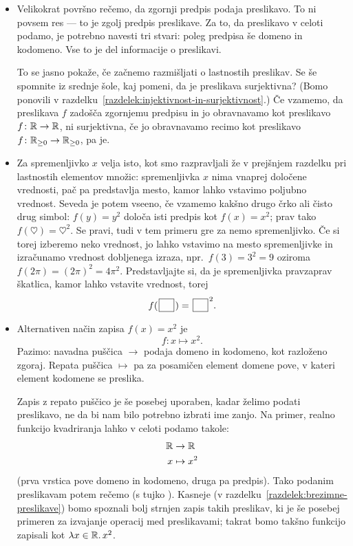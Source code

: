 \begin{itemize}
\item
Velikokrat površno rečemo, da zgornji predpis podaja preslikavo. To ni povsem res --- to je zgolj predpis preslikave. Za to, da preslikavo v celoti podamo, je potrebno navesti tri stvari: poleg predpisa še domeno in kodomeno. Vse to je del informacije o preslikavi.


To se jasno pokaže, če začnemo razmišljati o lastnostih preslikav. Se še spomnite iz srednje šole, kaj pomeni, da je preslikava surjektivna? (Bomo ponovili v razdelku~\ref{razdelek:injektivnost-in-surjektivnost}.) Če vzamemo, da preslikava $f$ zadošča zgornjemu predpisu in jo obravnavamo kot preslikavo $f\colon \mathbb{R} \to \mathbb{R}$, ni surjektivna, če jo obravnavamo recimo kot preslikavo $f\colon \mathbb{R}_{\geq 0} \to \mathbb{R}_{\geq 0}$, pa je.
\item
Za spremenljivko $x$ velja isto, kot smo razpravljali že v prejšnjem razdelku pri lastnostih elementov množic: spremenljivka $x$ nima vnaprej določene vrednosti, pač pa predstavlja mesto, kamor lahko vstavimo poljubno vrednost. Seveda je potem vseeno, če vzamemo kakšno drugo črko ali čisto drug simbol: $f(y) = y^2$ določa isti predpis kot $f(x) = x^2$; prav tako $f(\heartsuit) = \heartsuit^2$. Se pravi, tudi v tem primeru gre za nemo spremenljivko. Če si torej izberemo neko vrednost, jo lahko vstavimo na mesto spremenljivke in izračunamo vrednost dobljenega izraza, npr.~$f(3) = 3^2 = 9$ oziroma $f(2\pi) = (2\pi)^2 = 4\pi^2$. Predstavljajte si, da je spremenljivka pravzaprav škatlica, kamor lahko vstavite vrednost, torej
\[f(\argbox) = \argbox^2.\]
\item
Alternativen način zapisa $f(x) = x^2$ je
\[f\colon x \mapsto x^2.\]
Pazimo: navadna puščica $\to$ podaja domeno in kodomeno, kot razloženo zgoraj. Repata puščica $\mapsto$ pa za posamičen element domene pove, v kateri element kodomene se preslika.

Zapis z repato puščico je še posebej uporaben, kadar želimo podati preslikavo, ne da bi nam bilo potrebno izbrati ime zanjo. Na primer, realno funkcijo kvadriranja lahko v celoti podamo takole:
\begin{align*}
\mathbb{R} &\to \mathbb{R} \\
x &\mapsto x^2
\end{align*}
(prva vrstica pove domeno in kodomeno, druga pa predpis). Tako podanim preslikavam potem rečemo  (s tujko ). Kasneje (v razdelku~\ref{razdelek:brezimne-preslikave}) bomo spoznali bolj strnjen zapis takih preslikav, ki je še posebej primeren za izvajanje operacij med preslikavami; takrat bomo takšno funkcijo zapisali kot $\lambda x \in \mathbb{R} .\, x^2$.
\end{itemize}

